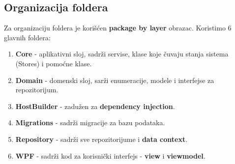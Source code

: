 \subsection{Organizacija foldera}
\par Za organizaciju foldera je korišćen \textbf{package by layer} obrazac. Koristimo 6 glavnih foldera:
\begin{enumerate}
    \item \textbf{Core} - aplikativni sloj, sadrži servise, klase koje čuvaju stanja sistema (Stores) i pomoćne klase.
    \item \textbf{Domain} - domenski sloj, sarži enumeracije, modele i interfejse za repozitorijum.
    \item \textbf{HostBuilder} - zadužen za \textbf{dependency injection}.
    \item \textbf{Migrations} - sadrži migracije za bazu podataka.
    \item \textbf{Repository} - sadrži sve repozitorijume i \textbf{data context}.
    \item \textbf{WPF} - sadrži kod za korisnički interfejs -  \textbf{view} i \textbf{viewmodel}.
\end{enumerate}